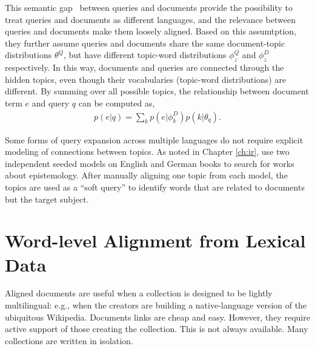 This semantic gap~\citep{Muller-2009} between queries and documents
provide the possibility to treat queries and documents as different languages, and the relevance between
queries and documents make them loosely aligned. Based on this assumtption, 
they further assume queries and documents share the same document-topic
distributions $\theta^Q$, but have different topic-word distributions
$\phi_z^Q$ and $\phi_z^D$ respectively.
In this way, documents and queries are
connected through the hidden topics, even though their vocabularies
(topic-word distributions) are different. By summing over all possible
topics, the relationship between document term $e$ and query $q$ can
be computed as,
\begin{align}
p(e|q) = \sum_k p(e|\phi_k^D) p(k | \theta_q).
\end{align}


Some forms of query expansion across multiple languages do not require explicit modeling of connections between topics.
As noted in Chapter \ref{ch:ir}, \citet{erlin2017topic} use two independent seeded models on English and German books to search for works about epistemology.
After manually aligning one topic from each model, the topics are used as a ``soft query'' to identify words that are related to documents but the target subject.

\section{Word-level Alignment from Lexical Data}

Aligned documents are useful when a collection is designed to be
lightly multilingual: e.g., when the creators are building a
native-language version of the ubiquitous Wikipedia.  Documents links
are cheap and easy. However, they require active support of those creating the
collection.  This is not always available.  Many collections are
written in isolation.

